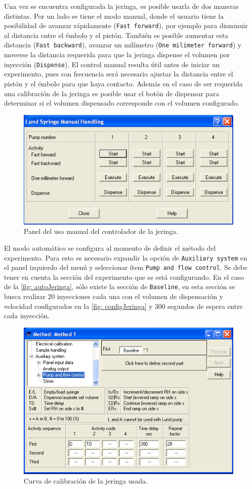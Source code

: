 	Una vez se encuentra configurada la jeringa, es posible usarla de dos maneras distintas. Por un lado se tiene el modo manual, donde el usuario tiene la posibilidad de avanzar rápidamente (\texttt{Fast forward}), por ejemplo para disminuir al distancia entre el émbolo y el pistón. También es posible aumentar esta distancia (\texttt{Fast backward}), avanzar un milímetro (\texttt{One milimeter forward}) y moverse la distancia requerida para que la jeringa dispense el volumen por inyección (\texttt{Dispense}). El control manual resulta útil antes de iniciar un experimento, pues con frecuencia será necesario ajustar la distancia entre el pistón y el émbolo para que haya contacto. Además en el caso de ser requerida una calibración de la jeringa es posible usar el botón de dispensar para determinar si el volumen dispensado corresponde con el volumen configurado.
	\begin{figure}[h]
		\centering
		\includegraphics[width=0.5\linewidth]{Figures/jeringa_manual}
		\caption{Panel del uso manual del controlador de la jeringa.}
		\label{fig: manualJeringa}
	\end{figure}

	El modo automático se configura al momento de definir el método del experimento. Para esto es necesario expandir la opción de \texttt{Auxiliary system} en el panel izquierdo del menú y seleccionar ítem \texttt{Pump and flow control}. Se debe tener en cuenta la sección del experimento que se está configurando. En el caso de la \autoref{fig: autoJeringa}, sólo existe la sección de \texttt{Baseline}, en esta sección se busca realizar 20 inyecciones cada una con el volumen de dispensación y velocidad configurados en la \autoref{fig: configJeringa} y 300 segundos de espera entre cada inyección.
	\begin{figure}[h]
		\centering
		\includegraphics[width=0.5\linewidth]{Figures/jeringa_experimento}
		\caption{Curva de calibraci\'on de la jeringa usada.}
		\label{fig: autoJeringa}
	\end{figure}
	
